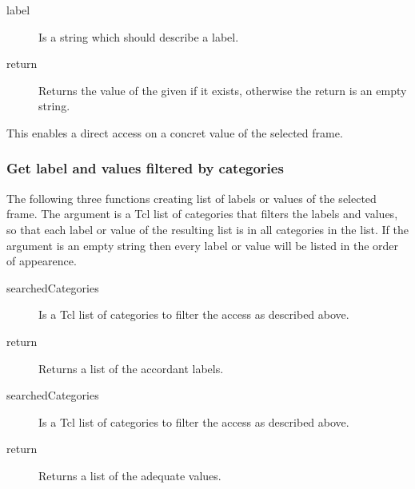    \begin{method}{  }
    	  \begin{description}	
	     \item[ label] 
		Is a string which should describe a label.
	     \item[ return] 
		Returns the value of the given  if it exists, 
		 otherwise the return is an empty string. 
	  \end{description}
	This enables a direct access on a concret value 
	 of the selected frame.
	\end{method}	

 \subsubsection{Get label and values filtered by categories}
  \label{ptelos_filtered_access}
	The following three functions creating list of labels or values of
	 the selected frame. 
	The argument  is a Tcl list of categories
	 that filters the labels and values, so that each label or value of
	 the resulting list is in all categories in the list.
	If the argument is an empty string then every label or value will be
	 listed in the order of appearence.	
	\\	
   \begin{method}{  }
    	  \begin{description}	
	     \item[ searchedCategories]
		Is a Tcl list of categories to filter the access 
		 as described above.
	     \item[ return]       
		Returns a list of the accordant labels.
	  \end{description}
	\end{method}	
   \begin{method}{  }
    	  \begin{description}	
	     \item[ searchedCategories]
		Is a Tcl list of categories to filter the access 
		 as described above.
	     \item[ return]       
		Returns a list of the adequate values.
	  \end{description}
	\end{method}	
